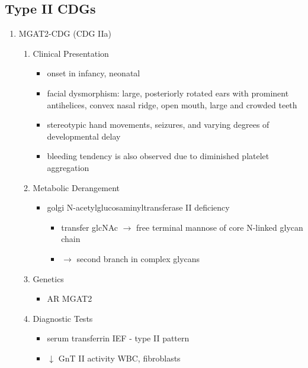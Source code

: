 \documentclass{scrartcl}
\begin{document}
\subsection{Type II CDGs}
\label{sec:orgd9fc8e2}
\begin{enumerate}
\item MGAT2-CDG (CDG IIa)
\label{sec:org9de57ea}
\begin{enumerate}
\item Clinical Presentation
\label{sec:orge1ebe9d}
\begin{itemize}
\item onset in infancy, neonatal
\item facial dysmorphism: large, posteriorly rotated ears with prominent
antihelices, convex nasal ridge, open mouth, large and crowded
teeth
\item stereotypic hand movements, seizures, and varying degrees of
developmental delay
\item bleeding tendency is also observed due to diminished platelet
aggregation
\end{itemize}

\item Metabolic Derangement
\label{sec:org773ddc9}
\begin{itemize}
\item golgi N-acetylglucosaminyltransferase II deficiency
\begin{itemize}
\item transfer glcNAc \(\to\) free terminal mannose of core N-linked glycan chain
\item \(\to\) second branch in complex glycans
\end{itemize}
\end{itemize}
\item Genetics
\label{sec:org0a6500c}
\begin{itemize}
\item AR MGAT2
\end{itemize}
\item Diagnostic Tests
\label{sec:orge53c6e2}
\begin{itemize}
\item serum transferrin IEF - type II pattern
\item \(\downarrow\) GnT II activity WBC, fibroblasts
\end{itemize}


\end{enumerate}
\end{enumerate}
\end{document}
